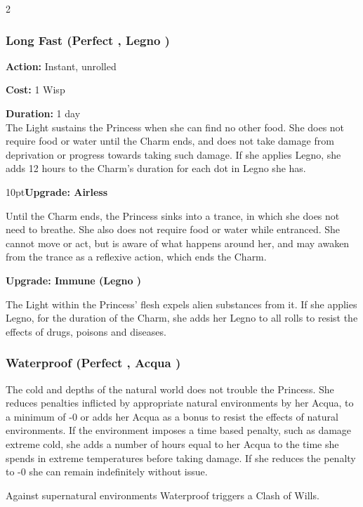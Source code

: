 \begin{multicols}{2}
\subsubsection*{Long Fast (Perfect \textbullet, Legno \textbullet)}

\noindent \textbf{Action:} Instant, unrolled

\noindent \textbf{Cost:} 1 Wisp

\noindent \textbf{Duration:} 1 day \\

\noindent The Light sustains the Princess when she can find no other food. She does not require food or water until the Charm ends, and does not take damage from deprivation or progress towards taking such damage. If she applies Legno, she adds 12 hours to the Charm's duration for each dot in Legno she has.

\begin{myindentpar}{10pt}\textbf{Upgrade: Airless}

Until the Charm ends, the Princess sinks into a trance, in which she does not need to breathe. She also does not require food or water while entranced. She cannot move or act, but is aware of what happens around her, and may awaken from the trance as a reflexive action, which ends the Charm.

\textbf{Upgrade: Immune (Legno \textbullet\textbullet)}

The Light within the Princess' flesh expels alien substances from it. If she applies Legno, for the duration of the Charm, she adds her Legno to all rolls to resist the effects of drugs, poisons and diseases.\end{myindentpar}

\subsubsection*{Waterproof (Perfect \textbullet, Acqua \textbullet)}

The cold and depths of the natural world does not trouble the Princess. She reduces penalties inflicted by appropriate natural environments by her Acqua, to a minimum of -0 or adds her Acqua as a bonus to resist the effects of natural environments. If the environment imposes a time based penalty, such as damage extreme cold, she adds a number of hours equal to her Acqua to the time she spends in extreme temperatures before taking damage.  If she reduces the penalty to -0 she can remain indefinitely without issue. 

Against supernatural environments Waterproof triggers a Clash of Wills.


\end{multicols}
